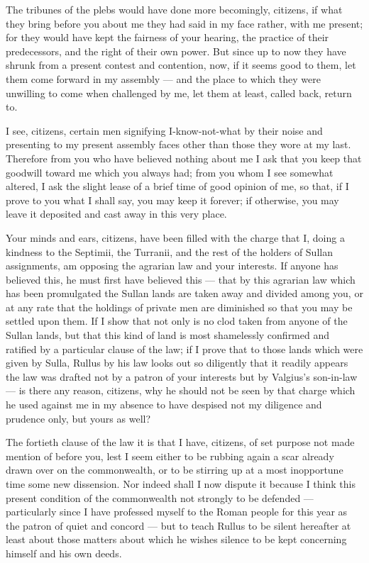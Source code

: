 %

 The tribunes of the plebs would have done more becomingly, citizens, if what they bring before you about me they had said in my face rather, with me present; for they would have kept the fairness of your hearing, the practice of their predecessors, and the right of their own power. But since up to now they have shrunk from a present contest and contention, now, if it seems good to them, let them come forward in my assembly --- and the place to which they were unwilling to come when challenged by me, let them at least, called back, return to.

 I see, citizens, certain men signifying I-know-not-what by their noise and presenting to my present assembly faces other than those they wore at my last. Therefore from you who have believed nothing about me I ask that you keep that goodwill toward me which you always had; from you whom I see somewhat altered, I ask the slight lease of a brief time of good opinion of me, so that, if I prove to you what I shall say, you may keep it forever; if otherwise, you may leave it deposited and cast away in this very place.

 Your minds and ears, citizens, have been filled with the charge that I, doing a kindness to the Septimii, the Turranii, and the rest of the holders of Sullan assignments, am opposing the agrarian law and your interests. If anyone has believed this, he must first have believed this --- that by this agrarian law which has been promulgated the Sullan lands are taken away and divided among you, or at any rate that the holdings of private men are diminished so that you may be settled upon them. If I show that not only is no clod taken from anyone of the Sullan lands, but that this kind of land is most shamelessly confirmed and ratified by a particular clause of the law; if I prove that to those lands which were given by Sulla, Rullus by his law looks out so diligently that it readily appears the law was drafted not by a patron of your interests but by Valgius's son-in-law --- is there any reason, citizens, why he should not be seen by that charge which he used against me in my absence to have despised not my diligence and prudence only, but yours as well?

 The fortieth clause of the law it is that I have, citizens, of set purpose not made mention of before you, lest I seem either to be rubbing again a scar already drawn over on the commonwealth, or to be stirring up at a most inopportune time some new dissension. Nor indeed shall I now dispute it because I think this present condition of the commonwealth not strongly to be defended --- particularly since I have professed myself to the Roman people for this year as the patron of quiet and concord --- but to teach Rullus to be silent hereafter at least about those matters about which he wishes silence to be kept concerning himself and his own deeds.

